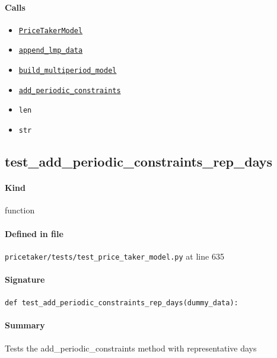 \documentclass[11pt]{report}
\begin{document}
\paragraph{Calls}
\begin{itemize}[leftmargin=*]
  \item \hyperref[def:pricetaker-price_taker_model.py:PriceTakerModel:L161]{\texttt{PriceTakerModel}}
  \item \hyperref[def:pricetaker-price_taker_model.py:PriceTakerModel.append_lmp_data:L221]{\texttt{append\_lmp\_data}}
  \item \hyperref[def:pricetaker-price_taker_model.py:PriceTakerModel.build_multiperiod_model:L291]{\texttt{build\_multiperiod\_model}}
  \item \hyperref[def:pricetaker-price_taker_model.py:PriceTakerModel.add_periodic_constraints:L598]{\texttt{add\_periodic\_constraints}}
  \item \texttt{len}
  \item \texttt{str}
\end{itemize}
\subsection{test\_add\_periodic\_constraints\_rep\_days}
\label{def:pricetaker-tests-test_price_taker_model.py:test_add_periodic_constraints_rep_days:L635}
\paragraph{Kind} function
\paragraph{Defined in file} \texttt{pricetaker/tests/test\_price\_taker\_model.py} at line 635
\paragraph{Signature} \texttt{def test\_add\_periodic\_constraints\_rep\_days(dummy\_data):}
\paragraph{Summary} Tests the add\_periodic\_constraints method with representative days
\end{document}
